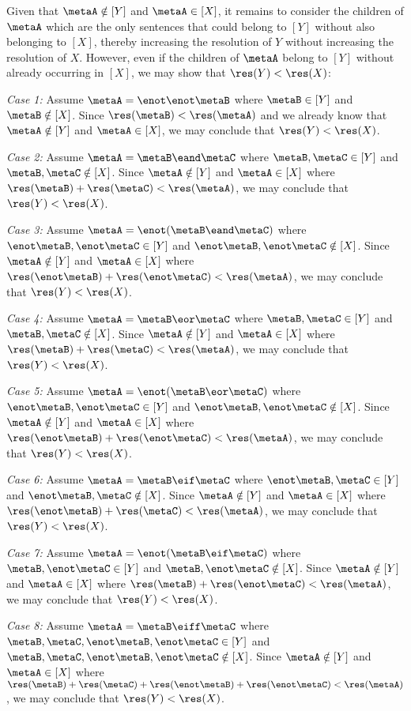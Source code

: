 Given that $\metaA\notin[Y]$ and $\metaA\in[X]$, it remains to consider the children of $\metaA$ which are the only sentences that could belong to $[Y]$ without also belonging to $[X]$, thereby increasing the resolution of $Y$ without increasing the resolution of $X$.
However, even if the children of $\metaA$ belong to $[Y]$ without already occurring in $[X]$, we may show that $\res(Y)<\res(X)$: 

\textit{Case 1:}
Assume $\metaA=\enot\enot\metaB$ where $\metaB\in[Y]$ and $\metaB\notin[X]$.
Since $\res(\metaB)<\res(\metaA)$ and we already know that $\metaA\notin[Y]$ and $\metaA\in[X]$, we may conclude that $\res(Y)<\res(X)$.

\textit{Case 2:}
Assume $\metaA=\metaB\eand\metaC$ where $\metaB,\metaC\in[Y]$ and $\metaB,\metaC\notin[X]$.
Since $\metaA\notin[Y]$ and $\metaA\in[X]$ where $\res(\metaB)+\res(\metaC)<\res(\metaA)$, we may conclude that $\res(Y)<\res(X)$.

\textit{Case 3:}
Assume $\metaA=\enot(\metaB\eand\metaC)$ where $\enot\metaB,\enot\metaC\in[Y]$ and $\enot\metaB,\enot\metaC\notin[X]$.
Since $\metaA\notin[Y]$ and $\metaA\in[X]$ where $\res(\enot\metaB)+\res(\enot\metaC)<\res(\metaA)$, we may conclude that $\res(Y)<\res(X)$.

\textit{Case 4:}
Assume $\metaA=\metaB\eor\metaC$ where $\metaB,\metaC\in[Y]$ and $\metaB,\metaC\notin[X]$.
Since $\metaA\notin[Y]$ and $\metaA\in[X]$ where $\res(\metaB)+\res(\metaC)<\res(\metaA)$, we may conclude that $\res(Y)<\res(X)$.

\textit{Case 5:}
Assume $\metaA=\enot(\metaB\eor\metaC)$ where $\enot\metaB,\enot\metaC\in[Y]$ and $\enot\metaB,\enot\metaC\notin[X]$.
Since $\metaA\notin[Y]$ and $\metaA\in[X]$ where $\res(\enot\metaB)+\res(\enot\metaC)<\res(\metaA)$, we may conclude that $\res(Y)<\res(X)$.

\textit{Case 6:}
Assume $\metaA=\metaB\eif\metaC$ where $\enot\metaB,\metaC\in[Y]$ and $\enot\metaB,\metaC\notin[X]$.
Since $\metaA\notin[Y]$ and $\metaA\in[X]$ where $\res(\enot\metaB)+\res(\metaC)<\res(\metaA)$, we may conclude that $\res(Y)<\res(X)$.

\textit{Case 7:}
Assume $\metaA=\enot(\metaB\eif\metaC)$ where $\metaB,\enot\metaC\in[Y]$ and $\metaB,\enot\metaC\notin[X]$.
Since $\metaA\notin[Y]$ and $\metaA\in[X]$ where $\res(\metaB)+\res(\enot\metaC)<\res(\metaA)$, we may conclude that $\res(Y)<\res(X)$.

\textit{Case 8:}
Assume $\metaA=\metaB\eiff\metaC$ where $\metaB,\metaC,\enot\metaB,\enot\metaC\in[Y]$ and $\metaB,\metaC,\enot\metaB,\enot\metaC\notin[X]$.
Since $\metaA\notin[Y]$ and $\metaA\in[X]$ where $\res(\metaB)+\res(\metaC)+\res(\enot\metaB)+\res(\enot\metaC)<\res(\metaA)$, we may conclude that $\res(Y)<\res(X)$.

